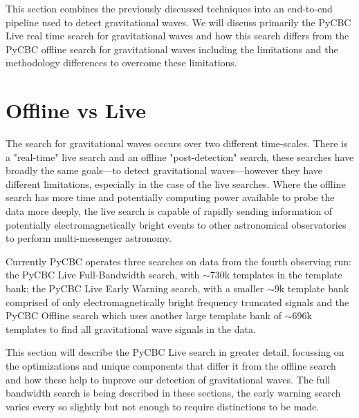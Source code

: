%


This section combines the previously discussed techniques into an end-to-end pipeline used to detect gravitational waves. We will discuss primarily the PyCBC Live real time search for gravitational waves and how this search differs from the PyCBC offline search for gravitational waves including the limitations and the methodology differences to overcome these limitations.

\section{\label{2:sec:offline-vs-live}Offline vs Live}

The search for gravitational waves occurs over two different time-scales. There is a "real-time" live search and an offline "post-detection" search, these searches have broadly the same goals---to detect gravitational waves---however they have different limitations, especially in the case of the live searches. Where the offline search has more time and potentially computing power available to probe the data more deeply, the live search is capable of rapidly sending information of potentially electromagnetically bright events to other astronomical observatories to perform multi-messenger astronomy.

Currently PyCBC operates three searches on data from the fourth observing run: the PyCBC Live Full-Bandwidth search, with $\sim$730k templates in the template bank; the PyCBC Live Early Warning search, with a smaller $\sim$9k template bank comprised of only electromagnetically bright frequency truncated signals and the PyCBC Offline search which uses another large template bank of $\sim$696k templates to find all gravitational wave signals in the data.

This section will describe the PyCBC Live search in greater detail, focussing on the optimizations and unique components that differ it from the offline search and how these help to improve our detection of gravitational waves. The full bandwidth search is being described in these sections, the early warning search varies every so slightly but not enough to require distinctions to be made.

